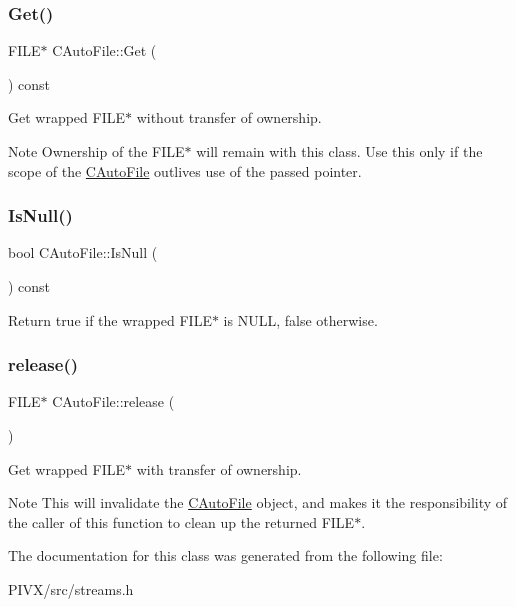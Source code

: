 \subsubsection{\texorpdfstring{Get()}{Get()}}
{\footnotesize\ttfamily F\+I\+LE$\ast$ C\+Auto\+File\+::\+Get (\begin{DoxyParamCaption}{ }\end{DoxyParamCaption}) const\hspace{0.3cm}{\ttfamily [inline]}}

Get wrapped F\+I\+L\+E$\ast$ without transfer of ownership. \begin{DoxyNote}{Note}
Ownership of the F\+I\+L\+E$\ast$ will remain with this class. Use this only if the scope of the \mbox{\hyperlink{class_c_auto_file}{C\+Auto\+File}} outlives use of the passed pointer. 
\end{DoxyNote}
\mbox{\label{class_c_auto_file_a7fd47268b6d85a89acafdb73559f8e78}} 
\subsubsection{\texorpdfstring{Is\+Null()}{IsNull()}}
{\footnotesize\ttfamily bool C\+Auto\+File\+::\+Is\+Null (\begin{DoxyParamCaption}{ }\end{DoxyParamCaption}) const\hspace{0.3cm}{\ttfamily [inline]}}

Return true if the wrapped F\+I\+L\+E$\ast$ is N\+U\+LL, false otherwise. \mbox{\label{class_c_auto_file_a25b51d94dc85c4140da0b15494ac9f8a}} 
\subsubsection{\texorpdfstring{release()}{release()}}
{\footnotesize\ttfamily F\+I\+LE$\ast$ C\+Auto\+File\+::release (\begin{DoxyParamCaption}{ }\end{DoxyParamCaption})\hspace{0.3cm}{\ttfamily [inline]}}

Get wrapped F\+I\+L\+E$\ast$ with transfer of ownership. \begin{DoxyNote}{Note}
This will invalidate the \mbox{\hyperlink{class_c_auto_file}{C\+Auto\+File}} object, and makes it the responsibility of the caller of this function to clean up the returned F\+I\+L\+E$\ast$. 
\end{DoxyNote}


The documentation for this class was generated from the following file\+:\begin{DoxyCompactItemize}
\item 
P\+I\+V\+X/src/streams.\+h\end{DoxyCompactItemize}
